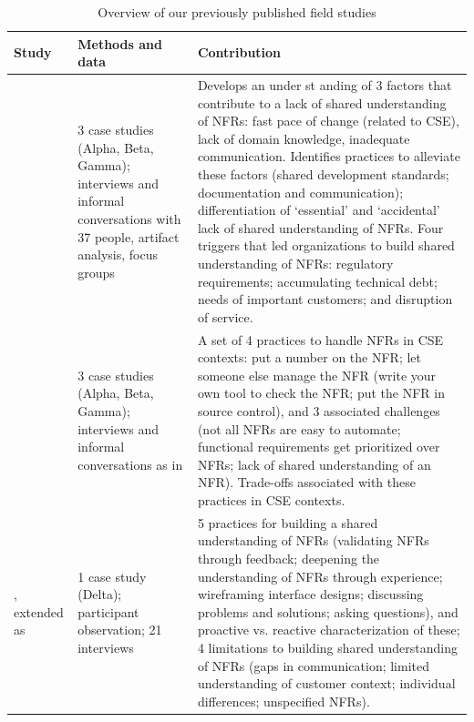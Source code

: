 \documentclass[smallextended]{svjour3}
\begin{document}
\begin{table}[!t]
    \caption{Overview of our previously published field studies}
    \label{tab:previous}
    \centering
    \begin{tabular}{P{1.9cm}p{3cm}p{6.4cm}}
    \toprule 
    Study & Methods and data & Contribution  \\
    \midrule 
    \cite{werner2020re} & 3 case studies (Alpha, Beta, Gamma); interviews and informal conversations with 37 people, artifact analysis, focus groups & Develops an under st anding of 3 factors that contribute to a lack of shared understanding of NFRs: fast pace of change (related to CSE), lack of domain knowledge, inadequate communication. Identifies practices to alleviate these factors (shared development standards; documentation and communication); differentiation of `essential' and `accidental' lack of shared understanding of NFRs. Four triggers that led organizations to build shared understanding of NFRs: regulatory requirements; accumulating technical debt; needs of important customers; and disruption of service.  \\
    \addlinespace
    \cite{werner_tse_2021} & 3 case studies (Alpha, Beta, Gamma); interviews and informal conversations as in \cite{werner2020re} & A set of 4 practices to handle NFRs in CSE contexts: put a number on the NFR; let someone else manage the NFR (write your own tool to check the NFR; put the NFR in source control), and 3 associated challenges (not all NFRs are easy to automate; functional requirements get prioritized over NFRs; lack of shared understanding of an NFR). Trade-offs associated with these practices in CSE contexts. \\
    \addlinespace
    \cite{okpara_re2022}, extended as \cite{okpara_rej2023} & 1 case study (Delta); participant observation; 21 interviews & 5 practices for building a shared understanding of NFRs (validating NFRs through feedback; deepening the understanding of NFRs through experience; wireframing interface designs; discussing problems and solutions; asking questions), and proactive vs. reactive characterization of these; 4 limitations to building shared understanding of NFRs (gaps in communication; limited understanding of customer context; individual differences; unspecified NFRs). \\    
    
    \bottomrule 
    \end{tabular}
    
\end{table}
\end{document}
